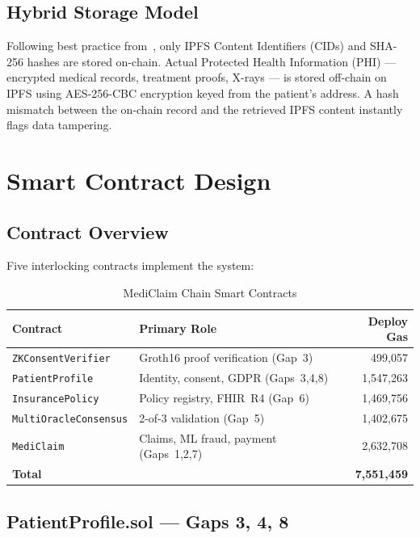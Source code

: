 \documentclass[journal]{IEEEtran}
\begin{document}
\subsection{Hybrid Storage Model}

Following best practice from~\cite{lit:springer_interop}, only IPFS Content
Identifiers (CIDs) and SHA-256 hashes are stored on-chain.
Actual Protected Health Information (PHI) — encrypted medical records,
treatment proofs, X-rays — is stored off-chain on IPFS using AES-256-CBC
encryption keyed from the patient's address. A hash mismatch between the
on-chain record and the retrieved IPFS content instantly flags data tampering.

\section{Smart Contract Design}
\label{sec:contracts}

\subsection{Contract Overview}

Five interlocking contracts implement the system:

\begin{table}[h]
\centering
\caption{MediClaim Chain Smart Contracts}
\label{tab:contracts}
\begin{tabular}{@{}llr@{}}
\toprule
Contract & Primary Role & Deploy Gas \\
\midrule
\texttt{ZKConsentVerifier} & Groth16 proof verification (Gap~3) & 499,057 \\
\texttt{PatientProfile}    & Identity, consent, GDPR (Gaps~3,4,8) & 1,547,263 \\
\texttt{InsurancePolicy}   & Policy registry, FHIR~R4 (Gap~6) & 1,469,756 \\
\texttt{MultiOracleConsensus} & 2-of-3 validation (Gap~5) & 1,402,675 \\
\texttt{MediClaim}         & Claims, ML fraud, payment (Gaps~1,2,7) & 2,632,708 \\
\midrule
\textbf{Total} & & \textbf{7,551,459} \\
\bottomrule
\end{tabular}
\end{table}

\subsection{PatientProfile.sol — Gaps 3, 4, 8}
\end{document}
